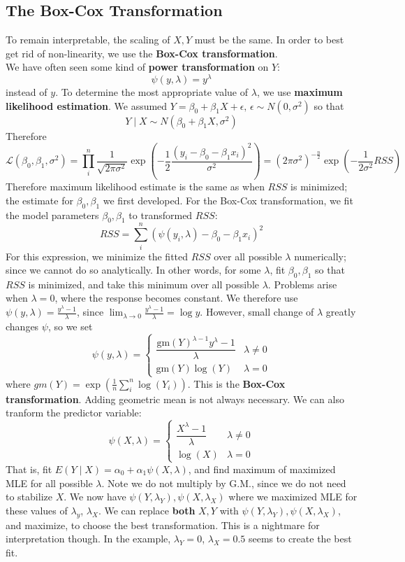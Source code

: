 \documentclass[12pt, a4paper]{article}
\theoremstyle{definition}
\newcommand{\lam}{\lambda}
\newcommand{\eps}{\epsilon}
\newcommand{\f}{\frac}
\newcommand{\df}{\dfrac}
\newcommand{\BB}[1]{\left(#1\right)}
\begin{document}
  	\subsection{The Box-Cox Transformation}
  	To remain interpretable, the scaling of $X, Y$ must be the same. In order to best get rid of non-linearity, we use the {\bf Box-Cox transformation}.\\
  	
  	We have often seen some kind of {\bf power transformation} on $Y$:
  	$$
  		\psi(y,\lambda) = y^\lambda 
  	$$ 
  	instead of $y$. To determine the most appropriate value of $\lam$, we use {\bf maximum likelihood estimation}. We assumed $Y = \beta_0 + \beta_1X + \eps,\, \eps \sim N(0, \sigma^2)$ so that 
  	$$
  		Y \mid X \sim N(\beta_0 + \beta_1X, \sigma^2)
  	$$
  	Therefore 
  	$$
  		\mathcal{L}(\beta_0, \beta_1, \sigma^2) = \prod_{i}^{n} \f{1}{\sqrt{2\pi\sigma^2}} \exp\BB{-\f12 \f{(y_i - \beta_0 - \beta_1 x_i)^2}{\sigma^2}} = \BB{2\pi\sigma^2}^{-\f{n}2} 
  		\exp\BB{-\f1{2 \sigma^2 } RSS}
  	$$
  	Therefore maximum likelihood estimate is the same as when $RSS$ is minimized; the estimate for $\beta_0, \beta_1$ we first developed. For the Box-Cox transformation, we fit the model parameters $\beta_0, \beta_1$ to transformed $RSS$: 
  	$$RSS = \sum_i^n (\psi(y_i, \lam) - \beta_0 - \beta_1 x_i)^2$$ 
  	For this expression, we minimize the fitted $RSS$ over all possible $\lam$ numerically; since we cannot do so analytically. In other words, for some $\lam$, fit $\beta_0, \beta_1$ so that $RSS$ is minimized, and take this minimum over all possible $\lam$. Problems arise when $\lam = 0$, where the response becomes constant. We therefore use $\psi(y, \lambda) = \f{y^\lambda - 1 }\lam$, since $\lim_{\lam \to 0}\f{y^\lambda - 1 }\lam = \log y $. However, small change of $\lam$ greatly changes $\psi$, so we set
  	$$
  		\psi(y, \lambda) = \begin{cases}
  			\df{\text{gm}(Y)^{\lam - 1}y^\lambda - 1 }\lam & \lam \neq 0 \\
  			\text{gm}(Y)\log(Y) & \lam = 0
  		\end{cases}
  	$$
  	where $gm(Y) = \exp \BB{ \f1n \sum_i^n \log(Y_i)}$.
  	This is the {\bf Box-Cox transformation}. Adding geometric mean is not always necessary. We can also tranform the predictor variable:
  	$$
  		\psi(X, \lambda) = 
  		\begin{cases}
  			\df{X^\lambda - 1 }\lam & \lam \neq 0 \\
  			\log(X) & \lam = 0
  		\end{cases}
  	$$
  	That is, fit $E(Y \mid X) = \alpha_0 + \alpha_1 \psi(X, \lambda)$, and find maximum of maximized MLE for all possible $\lam$.
  	Note we do not multiply by G.M., since we do not need to stabilize $X$. We now have $\psi(Y, \lambda_Y), \psi(X, \lambda_X)$ where we maximized MLE for these values of $\lambda_y$, $\lambda_X$. We can replace {\bf both} $X,Y$ with $\psi(Y, \lambda_Y), \psi(X, \lambda_X)$, and maximize, to choose the best transformation. 	This is a nightmare for interpretation though. In the example, $\lambda_Y = 0$, $\lambda_X = 0.5$ seems to create the best fit. \\
  	
\end{document}
